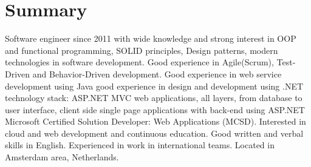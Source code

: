 \section{Summary}

Software engineer since 2011 with wide knowledge and strong interest in OOP and functional programming,
SOLID principles, Design patterns, modern technologies in software development.
Good experience in Agile(Scrum), Test-Driven and Behavior-Driven development.
Good experience in web service development using Java
good experience in design and development using .NET technology stack:
ASP.NET MVC web applications, all layers, from database to user interface, client side single page
applications with back-end using ASP.NET
Microsoft Certified Solution Developer: Web Applications (MCSD).
Interested in cloud and web development and continuous education.
Good written and verbal skills in English. Experienced in work in international teams.
Located in Amsterdam area, Netherlands.

